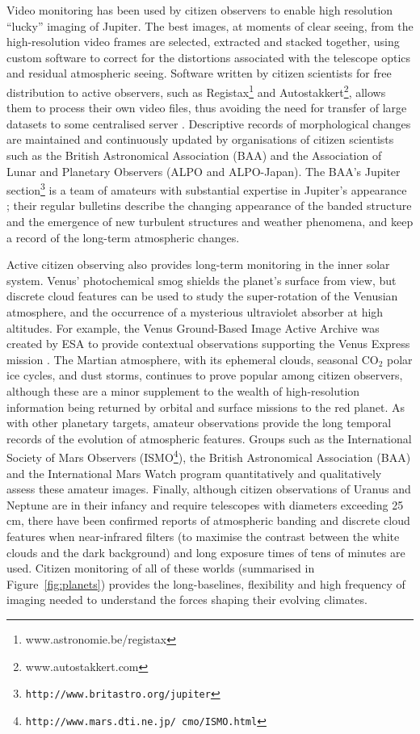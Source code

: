 \documentclass{ar2e}
\def\Fref#1{Figure~\ref{#1}\xspace}
\def\url#1{\texttt{#1}}
\begin{document}
Video monitoring has been used by citizen observers to enable high resolution
``lucky'' imaging of Jupiter. The best images, at moments of clear seeing, from
the high-resolution video frames are selected, extracted and stacked together,
using custom software to correct for the distortions associated with the
telescope optics and residual atmospheric seeing.  Software written by citizen
scientists for free distribution to active observers, such as
Registax\footnote{www.astronomie.be/registax} and
Autostakkert\footnote{www.autostakkert.com},  allows them to process their own
video files, thus avoiding the need for transfer of large datasets to some
centralised server \citep[see][for a thorough review]{14mousis_proam}. 
Descriptive records of morphological changes are maintained and continuously
updated by organisations of citizen scientists such as the British Astronomical
Association (BAA) and the Association of Lunar and Planetary Observers (ALPO and ALPO-Japan).
The BAA's Jupiter section\footnote{\url{http://www.britastro.org/jupiter}} is a
team of amateurs with substantial expertise in Jupiter's appearance
\citep{95rogers};  their regular bulletins describe the changing appearance of
the banded structure and the emergence of new turbulent structures and weather
phenomena, and keep a record of the long-term atmospheric changes.  

Active citizen observing also provides long-term monitoring in the inner solar
system.  Venus' photochemical smog shields the planet's surface from view, but
discrete cloud features can be used to study the super-rotation of the Venusian
atmosphere, and the occurrence of a mysterious ultraviolet absorber at high
altitudes.  For example, the Venus Ground-Based Image Active Archive was created
by ESA to provide contextual observations supporting the Venus Express mission
\citep{08barentsen}.  The Martian atmosphere, with its ephemeral clouds,
seasonal CO$_2$ polar ice cycles, and dust storms, continues to prove popular
among citizen observers, although these are a minor supplement to the wealth of
high-resolution information being returned by orbital and surface missions to
the red planet.  As with other planetary targets, amateur observations provide
the long temporal records of the evolution of atmospheric features.  Groups such
as the International Society of Mars Observers
(ISMO\footnote{\url{http://www.mars.dti.ne.jp/~cmo/ISMO.html}}), the British
Astronomical Association (BAA) and the International Mars Watch program
quantitatively and qualitatively assess these amateur images.  Finally, although
citizen observations of Uranus and Neptune are in their infancy and require
telescopes with diameters exceeding 25 cm, there have been confirmed reports of
atmospheric banding and discrete cloud features when near-infrared filters  (to
maximise the contrast between the white clouds and the dark background) and long
exposure times of tens of minutes are used.  Citizen monitoring of all of these
worlds (summarised in \Fref{fig:planets}) provides the long-baselines,
flexibility and high frequency of imaging needed to understand the forces
shaping their evolving climates.
\end{document}
